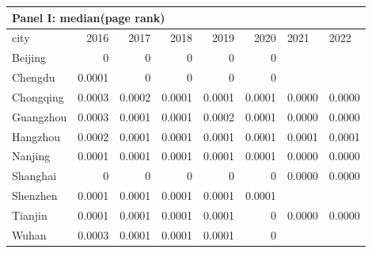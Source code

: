 \begin{tabular}{lrrrrrll}
    \multicolumn{8}{l}{\textbf{Panel I: median(page rank)}}\\
\hline
 city      &   2016 &   2017 &   2018 &   2019 &   2020 & 2021   & 2022   \\
\hline
 Beijing   & 0      & 0      & 0      & 0      & 0      &        &        \\
 Chengdu   & 0.0001 & 0      & 0      & 0      & 0      &        &        \\
 Chongqing & 0.0003 & 0.0002 & 0.0001 & 0.0001 & 0.0001 & 0.0000 & 0.0000 \\
 Guangzhou & 0.0003 & 0.0001 & 0.0001 & 0.0002 & 0.0001 & 0.0000 & 0.0000 \\
 Hangzhou  & 0.0002 & 0.0001 & 0.0001 & 0.0001 & 0.0001 & 0.0001 & 0.0001 \\
 Nanjing   & 0.0001 & 0.0001 & 0.0001 & 0.0001 & 0.0001 & 0.0000 & 0.0000 \\
 Shanghai  & 0      & 0      & 0      & 0      & 0      & 0.0000 & 0.0000 \\
 Shenzhen  & 0.0001 & 0.0001 & 0.0001 & 0.0001 & 0.0001 &        &        \\
 Tianjin   & 0.0001 & 0.0001 & 0.0001 & 0.0001 & 0      & 0.0000 & 0.0000 \\
 Wuhan     & 0.0003 & 0.0001 & 0.0001 & 0.0001 & 0      &        &        \\
\hline
\end{tabular}

